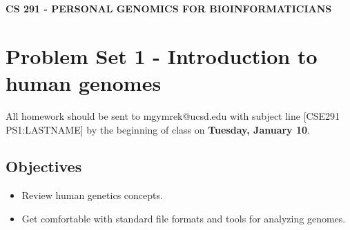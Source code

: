 \documentclass[12pt]{article}
\begin{document}
\textbf{CS 291 - PERSONAL GENOMICS FOR BIOINFORMATICIANS}

\section*{Problem Set 1 - Introduction to human genomes}

All homework should be sent to mgymrek@ucsd.edu with subject line [CSE291 PS1:LASTNAME] by the beginning of class on \textbf{Tuesday, January 10}.

\subsection*{Objectives}
\begin{itemize}
\item Review human genetics concepts.
\item Get comfortable with standard file formats and tools for analyzing genomes.
\end{itemize}

\end{document}

